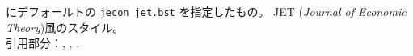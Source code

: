 \documentclass[10pt]{jarticle}
\begin{document}
\verb|| にデフォールトの \verb|jecon_jet.bst| を指定したもの。
JET (\textit{Journal of Economic Theory})風のスタイル。
\vspace{1em}\\
引用部分：\citet{brezis93:_leapf_inter_compet},
\citet{ito85:_inte_trad}, \citet{brezis93:_leapf_inter_compet}.

\nocite{*}


% 


\end{document}
